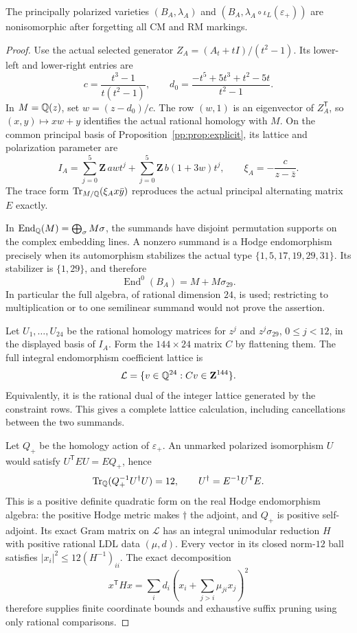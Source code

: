\begin{proposition}
\label{pp:prop:unmarkeda}
The principally polarized varieties
$(B_A,\lambda_A)$ and $(B_A,\lambda_A\circ\iota_L(\varepsilon_+))$
are nonisomorphic after forgetting all CM and RM markings.
\end{proposition}
\begin{proof}
Use the actual selected generator $Z_A=(A_t+tI)/(t^2-1)$.
Its lower-left and lower-right entries are
\[
 c=\frac{t^3-1}{t(t^2-1)},\qquad
 d_0=\frac{-t^5+5t^3+t^2-5t}{t^2-1}.
\]
In $M=\mathbb Q(z)$, set $w=(z-d_0)/c$.
The row $(w,1)$ is an eigenvector of $Z_A^{\mathsf T}$, so
$(x,y)\mapsto xw+y$ identifies the actual rational homology with $M$.
On the common principal basis of Proposition~\ref{pp:prop:explicit},
its lattice and polarization parameter are
\[
 I_A=\sum_{j=0}^5\mathbf Z\,awt^j
       +\sum_{j=0}^5\mathbf Z\,b(1+3w)t^j,\qquad
 \xi_A=-\frac{c}{z-\bar z}.
\]
The trace form $\operatorname{Tr}_{M/\mathbb Q}(\xi_Ax\bar y)$
reproduces the actual principal alternating matrix $E$ exactly.

In $\operatorname{End}_{\mathbb Q}(M)=\bigoplus_\sigma M\sigma$,
the summands have disjoint permutation supports on the complex
embedding lines. A nonzero summand is a Hodge endomorphism precisely
when its automorphism stabilizes the actual type
$\{1,5,17,19,29,31\}$. Its stabilizer is $\{1,29\}$, and therefore
\[
 \operatorname{End}^0(B_A)=M+M\sigma_{29}.
\]
In particular the full algebra, of rational dimension $24$, is used;
restricting to multiplication or to one semilinear summand would
not prove the assertion.

Let $U_1,\ldots,U_{24}$ be the rational homology matrices for
$z^j$ and $z^j\sigma_{29}$, $0\le j<12$, in the displayed basis
of $I_A$. Form the $144\times24$ matrix $C$ by flattening them.
The full integral endomorphism coefficient lattice is
\[
 \mathcal L=\{v\in\mathbb Q^{24}:Cv\in\mathbf Z^{144}\}.
\]
Equivalently, it is the rational dual of the integer lattice
generated by the constraint rows. This gives a complete lattice
calculation, including cancellations between the two summands.

Let $Q_+$ be the homology action of $\varepsilon_+$.
An unmarked polarized isomorphism $U$ would satisfy
$U^{\mathsf T}EU=EQ_+$, hence
\[
 \operatorname{Tr}_{\mathbb Q}(Q_+^{-1}U^\dagger U)=12,\qquad
 U^\dagger=E^{-1}U^{\mathsf T}E.
\]
This is a positive definite quadratic form on the real Hodge
endomorphism algebra: the positive Hodge metric makes $\dagger$
the adjoint, and $Q_+$ is positive self-adjoint.
Its exact Gram matrix on $\mathcal L$ has an integral unimodular
reduction $H$ with positive rational LDL data $(\mu,d)$.
Every vector in its closed norm-$12$ ball satisfies
$|x_i|^2\le12(H^{-1})_{ii}$. The exact decomposition
\[
 x^{\mathsf T}Hx=\sum_i d_i
       \left(x_i+\sum_{j>i}\mu_{ji}x_j\right)^2
\]
therefore supplies finite coordinate bounds and exhaustive
suffix pruning using only rational comparisons.


\end{proof}
